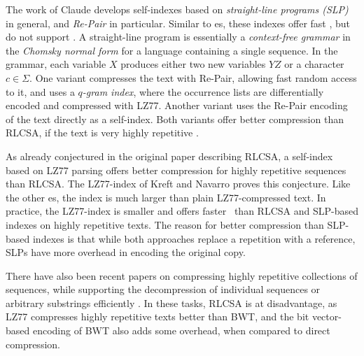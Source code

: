The work of Claude  develops self-indexes based on \emph{straight-line programs (SLP)} in general, and \emph{Re\nobreakdash-Pair} \cite{Larsson1999} in particular. Similar to \lzindex{}es, these indexes offer fast \locate, but do not support \find. A straight-line program is essentially a \emph{context-free grammar} in the \emph{Chomsky normal form} for a language containing a single sequence. In the grammar, each variable $X$ produces either two new variables $YZ$ or a character $c \in \Sigma$. One variant compresses the text with Re\nobreakdash-Pair, allowing fast random access to it, and uses a \emph{$q$\nobreakdash-gram index}, where the occurrence lists are differentially encoded and compressed with LZ77. Another variant uses the Re\nobreakdash-Pair encoding of the text directly as a self-index. Both variants offer better compression than RLCSA, if the text is very highly repetitive \cite{Claude2010}.

As already conjectured in the original paper describing RLCSA, a self-index based on LZ77 parsing offers better compression for highly repetitive sequences than RLCSA. The LZ77\nobreakdash-index of Kreft and Navarro \cite{Kreft2011} proves this conjecture. Like the other \lzindex{}es, the index is much larger than plain LZ77-compressed text. In practice, the LZ77\nobreakdash-index is smaller and offers faster \locate\ than RLCSA and SLP-based indexes on highly repetitive texts. The reason for better compression than SLP-based indexes is that while both approaches replace a repetition with a reference, SLPs have more overhead in encoding the original copy.

There have also been recent papers on compressing highly repetitive collections of sequences, while supporting the decompression of individual sequences or arbitrary substrings efficiently \cite{Kuruppu2010,Ferragina2010a,Kreft2010}. In these tasks, RLCSA is at disadvantage, as LZ77 compresses highly repetitive texts better than BWT, and the bit vector-based encoding of BWT also adds some overhead, when compared to direct compression. 
